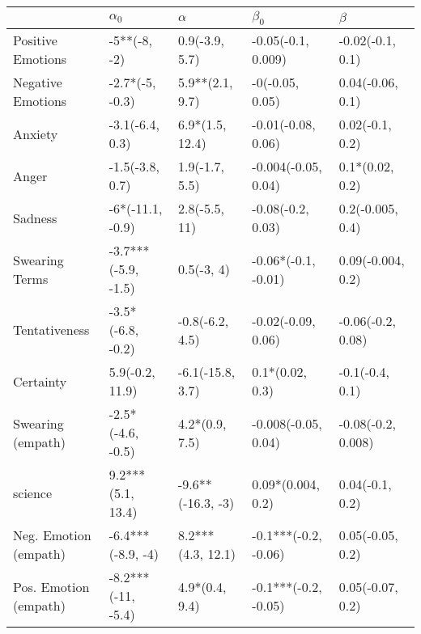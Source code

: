 \begin{tabular}{lllll}
\toprule
{} &           $\alpha_0$ &           $\alpha$ &             $\beta_0$ &             $\beta$ \\
\midrule
Positive Emotions     &         -5**(-8, -2) &     0.9(-3.9, 5.7) &    -0.05(-0.1, 0.009) &    -0.02(-0.1, 0.1) \\
Negative Emotions     &      -2.7*(-5, -0.3) &    5.9**(2.1, 9.7) &       -0(-0.05, 0.05) &    0.04(-0.06, 0.1) \\
Anxiety               &      -3.1(-6.4, 0.3) &    6.9*(1.5, 12.4) &    -0.01(-0.08, 0.06) &     0.02(-0.1, 0.2) \\
Anger                 &      -1.5(-3.8, 0.7) &     1.9(-1.7, 5.5) &   -0.004(-0.05, 0.04) &     0.1*(0.02, 0.2) \\
Sadness               &     -6*(-11.1, -0.9) &      2.8(-5.5, 11) &     -0.08(-0.2, 0.03) &    0.2(-0.005, 0.4) \\
Swearing Terms        &  -3.7***(-5.9, -1.5) &         0.5(-3, 4) &   -0.06*(-0.1, -0.01) &   0.09(-0.004, 0.2) \\
Tentativeness         &    -3.5*(-6.8, -0.2) &    -0.8(-6.2, 4.5) &    -0.02(-0.09, 0.06) &   -0.06(-0.2, 0.08) \\
Certainty             &      5.9(-0.2, 11.9) &   -6.1(-15.8, 3.7) &       0.1*(0.02, 0.3) &     -0.1(-0.4, 0.1) \\
Swearing (empath)     &    -2.5*(-4.6, -0.5) &     4.2*(0.9, 7.5) &   -0.008(-0.05, 0.04) &  -0.08(-0.2, 0.008) \\
science               &    9.2***(5.1, 13.4) &  -9.6**(-16.3, -3) &     0.09*(0.004, 0.2) &     0.04(-0.1, 0.2) \\
Neg. Emotion (empath) &    -6.4***(-8.9, -4) &  8.2***(4.3, 12.1) &  -0.1***(-0.2, -0.06) &    0.05(-0.05, 0.2) \\
Pos. Emotion (empath) &   -8.2***(-11, -5.4) &     4.9*(0.4, 9.4) &  -0.1***(-0.2, -0.05) &    0.05(-0.07, 0.2) \\
\bottomrule
\end{tabular}
